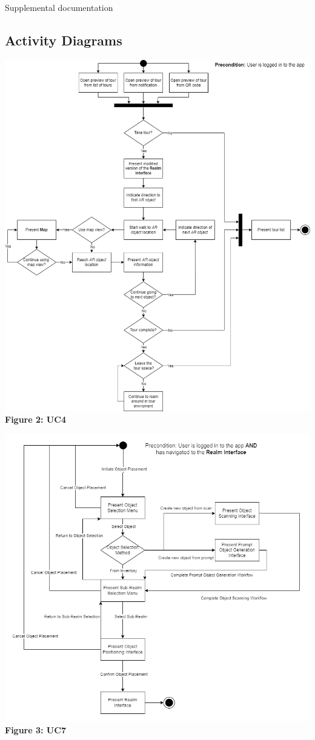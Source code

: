 \documentclass{article}
\begin{document}
Supplemental documentation

\subsection{Activity Diagrams}
\label{sub:activity_diagrams}

\begin{center}
    \includegraphics[scale=0.4]{SequenceDiagrams/UC4.png}\\
    \textbf{Figure 2: UC4}
\end{center}

\begin{center}
    \includegraphics[scale=0.4]{SequenceDiagrams/uc7.png}\\
    \textbf{Figure 3: UC7}
\end{center}
\end{document}
